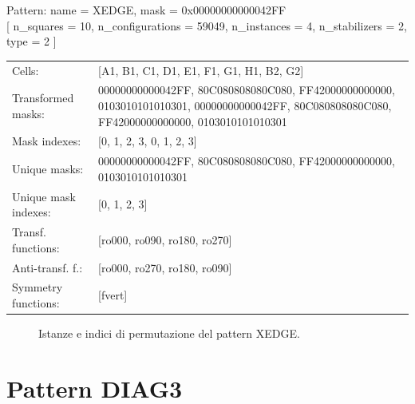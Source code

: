 \begin{tcolorbox}[sharp corners, fontupper=\ttfamily\small, colback=white]
  \noindent Pattern: name = XEDGE, mask = 0x00000000000042FF\\
  {[} n\_squares = 10, n\_configurations = 59049,
  n\_instances = 4, n\_stabilizers = 2, type = 2 { ]}\\[1.0ex]
  \begin{tabularx}{\textwidth}{@{} p{3.5cm} X @{}}
    Cells:               & {[}A1, B1, C1, D1, E1, F1, G1, H1, B2, G2{]}\\[0.5ex]
    Transformed masks:   & 00000000000042FF, 80C080808080C080, FF42000000000000, 0103010101010301, 00000000000042FF, 80C080808080C080, FF42000000000000, 0103010101010301\\[0.5ex]
    Mask indexes:        & {[}0, 1, 2, 3, 0, 1, 2, 3{]}\\[0.5ex]
    Unique masks:        & 00000000000042FF, 80C080808080C080, FF42000000000000, 0103010101010301\\[0.5ex]
    Unique mask indexes: & {[}0, 1, 2, 3{]}\\[0.5ex]
    Transf. functions:   & {[}ro000, ro090, ro180, ro270{]}\\[0.5ex]
    Anti-transf. f.:     & {[}ro000, ro270, ro180, ro090{]}\\[0.5ex]
    Symmetry functions:  & {[}fvert{]}\\[0.5ex]
  \end{tabularx}
\end{tcolorbox}

\begin{figure}[htbp]
  \centering
   \hfill
   \hfill
   \hfill
  \vspace{0.3cm}
   \hfill
   \hfill
   \hfill
  \caption{Istanze e indici di permutazione del pattern XEDGE.}
\end{figure}

\newpage

\section{Pattern DIAG3}

